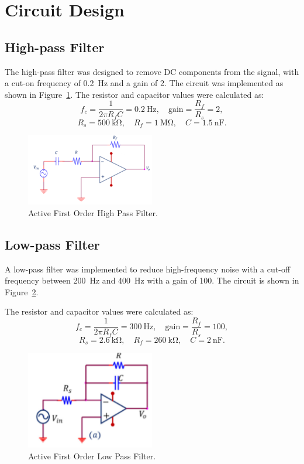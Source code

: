 \documentclass[11pt]{article}
\begin{document}
\section{Circuit Design}
\subsection{High-pass Filter}
The high-pass filter was designed to remove DC components from the signal, with a cut-on frequency of \SI{0.2}{\hertz} and a gain of 2. The circuit was implemented as shown in Figure~\ref{fig:highpass}. The resistor and capacitor values were calculated as:
\[
  f_c = \frac{1}{2 \pi R_f C} = \SI{0.2}{\hertz}, \quad \text{gain} = \frac{R_f}{R_s} = 2,
\]
\[
  R_s = \SI{500}{\kilo\ohm}, \quad R_f = \SI{1}{\mega\ohm}, \quad C = \SI{1.5}{\nano\farad}.
\]
\begin{figure}[H]
  \centering
  \includegraphics[width=0.5\textwidth]{photos/Active_First_Order_High_Pass_Filter.png}
  \caption{Active First Order High Pass Filter.}
  \label{fig:highpass}
\end{figure}
\subsection{Low-pass Filter}
A low-pass filter was implemented to reduce high-frequency noise with a cut-off frequency between \SI{200}{\hertz} and \SI{400}{\hertz} with a gain of 100. The circuit is shown in Figure~\ref{fig:lowpass}.

The resistor and capacitor values were calculated as:
\[
  f_c = \frac{1}{2 \pi R_f C} = \SI{300}{\hertz}, \quad \text{gain} = \frac{R_f}{R_s} = 100,
\]
\[
  R_s = \SI{2.6}{\kilo\ohm}, \quad R_f = \SI{260}{\kilo\ohm}, \quad C = \SI{2}{\nano\farad}.
\]
\begin{figure}[H]
  \centering
  \includegraphics[width=0.5\textwidth]{photos/Active_First_Order_Low_Pass_Filter.png}
  \caption{Active First Order Low Pass Filter.}
  \label{fig:lowpass}
\end{figure}
\end{document}
